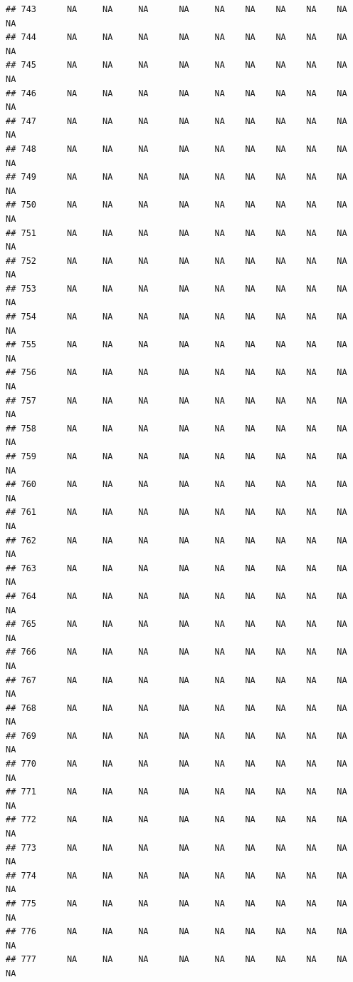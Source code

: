 \documentclass{article}\usepackage{graphicx, color}
\makeatletter
\newenvironment{kframe}{%
 \def\at@end@of@kframe{}%
 \ifinner\ifhmode%
  \def\at@end@of@kframe{\end{minipage}}%
  \begin{minipage}{\columnwidth}%
 \fi\fi%
 \def\FrameCommand##1{\hskip\@totalleftmargin \hskip-\fboxsep
 \colorbox{shadecolor}{##1}\hskip-\fboxsep
     \hskip-\linewidth \hskip-\@totalleftmargin \hskip\columnwidth}%
 \MakeFramed {\advance\hsize-\width
   \@totalleftmargin\z@ \linewidth\hsize
   \@setminipage}}%
 {\par\unskip\endMakeFramed%
 \at@end@of@kframe}
\newenvironment{knitrout}{}{} %
\makeatother
\begin{document}
\begin{knitrout}
\begin{kframe}
\begin{verbatim}
## 743      NA     NA     NA      NA     NA    NA    NA    NA    NA     NA
## 744      NA     NA     NA      NA     NA    NA    NA    NA    NA     NA
## 745      NA     NA     NA      NA     NA    NA    NA    NA    NA     NA
## 746      NA     NA     NA      NA     NA    NA    NA    NA    NA     NA
## 747      NA     NA     NA      NA     NA    NA    NA    NA    NA     NA
## 748      NA     NA     NA      NA     NA    NA    NA    NA    NA     NA
## 749      NA     NA     NA      NA     NA    NA    NA    NA    NA     NA
## 750      NA     NA     NA      NA     NA    NA    NA    NA    NA     NA
## 751      NA     NA     NA      NA     NA    NA    NA    NA    NA     NA
## 752      NA     NA     NA      NA     NA    NA    NA    NA    NA     NA
## 753      NA     NA     NA      NA     NA    NA    NA    NA    NA     NA
## 754      NA     NA     NA      NA     NA    NA    NA    NA    NA     NA
## 755      NA     NA     NA      NA     NA    NA    NA    NA    NA     NA
## 756      NA     NA     NA      NA     NA    NA    NA    NA    NA     NA
## 757      NA     NA     NA      NA     NA    NA    NA    NA    NA     NA
## 758      NA     NA     NA      NA     NA    NA    NA    NA    NA     NA
## 759      NA     NA     NA      NA     NA    NA    NA    NA    NA     NA
## 760      NA     NA     NA      NA     NA    NA    NA    NA    NA     NA
## 761      NA     NA     NA      NA     NA    NA    NA    NA    NA     NA
## 762      NA     NA     NA      NA     NA    NA    NA    NA    NA     NA
## 763      NA     NA     NA      NA     NA    NA    NA    NA    NA     NA
## 764      NA     NA     NA      NA     NA    NA    NA    NA    NA     NA
## 765      NA     NA     NA      NA     NA    NA    NA    NA    NA     NA
## 766      NA     NA     NA      NA     NA    NA    NA    NA    NA     NA
## 767      NA     NA     NA      NA     NA    NA    NA    NA    NA     NA
## 768      NA     NA     NA      NA     NA    NA    NA    NA    NA     NA
## 769      NA     NA     NA      NA     NA    NA    NA    NA    NA     NA
## 770      NA     NA     NA      NA     NA    NA    NA    NA    NA     NA
## 771      NA     NA     NA      NA     NA    NA    NA    NA    NA     NA
## 772      NA     NA     NA      NA     NA    NA    NA    NA    NA     NA
## 773      NA     NA     NA      NA     NA    NA    NA    NA    NA     NA
## 774      NA     NA     NA      NA     NA    NA    NA    NA    NA     NA
## 775      NA     NA     NA      NA     NA    NA    NA    NA    NA     NA
## 776      NA     NA     NA      NA     NA    NA    NA    NA    NA     NA
## 777      NA     NA     NA      NA     NA    NA    NA    NA    NA     NA

\end{verbatim}
\end{kframe}
\end{knitrout}
\end{document}
